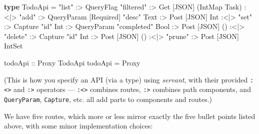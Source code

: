 \documentclass[]{article}
\newenvironment{Shaded}{}{}
\newcommand{\DataTypeTok}[1]{\textcolor[rgb]{0.56,0.13,0.00}{#1}}
\newcommand{\KeywordTok}[1]{\textcolor[rgb]{0.00,0.44,0.13}{\textbf{#1}}}
\newcommand{\NormalTok}[1]{#1}
\newcommand{\OperatorTok}[1]{\textcolor[rgb]{0.40,0.40,0.40}{#1}}
\newcommand{\OtherTok}[1]{\textcolor[rgb]{0.00,0.44,0.13}{#1}}
\newcommand{\StringTok}[1]{\textcolor[rgb]{0.25,0.44,0.63}{#1}}
\begin{document}
\begin{Shaded}
\begin{Highlighting}[]
\KeywordTok{type} \DataTypeTok{TodoApi} \OtherTok{=} \StringTok{"list"}   \OperatorTok{:\textgreater{}} \DataTypeTok{QueryFlag} \StringTok{"filtered"}
                        \OperatorTok{:\textgreater{}} \DataTypeTok{Get}\NormalTok{  \textquotesingle{}[}\DataTypeTok{JSON}\NormalTok{] (}\DataTypeTok{IntMap} \DataTypeTok{Task}\NormalTok{)}
          \OperatorTok{:\textless{}|\textgreater{}} \StringTok{"add"}    \OperatorTok{:\textgreater{}} \DataTypeTok{QueryParam\textquotesingle{}}\NormalTok{ \textquotesingle{}[}\DataTypeTok{Required}\NormalTok{] }\StringTok{"desc"} \DataTypeTok{Text}
                        \OperatorTok{:\textgreater{}} \DataTypeTok{Post}\NormalTok{ \textquotesingle{}[}\DataTypeTok{JSON}\NormalTok{] }\DataTypeTok{Int}
          \OperatorTok{:\textless{}|\textgreater{}} \StringTok{"set"}    \OperatorTok{:\textgreater{}} \DataTypeTok{Capture} \StringTok{"id"} \DataTypeTok{Int}
                        \OperatorTok{:\textgreater{}} \DataTypeTok{QueryParam} \StringTok{"completed"} \DataTypeTok{Bool}
                        \OperatorTok{:\textgreater{}} \DataTypeTok{Post}\NormalTok{ \textquotesingle{}[}\DataTypeTok{JSON}\NormalTok{] ()}
          \OperatorTok{:\textless{}|\textgreater{}} \StringTok{"delete"} \OperatorTok{:\textgreater{}} \DataTypeTok{Capture} \StringTok{"id"} \DataTypeTok{Int}
                        \OperatorTok{:\textgreater{}} \DataTypeTok{Post}\NormalTok{ \textquotesingle{}[}\DataTypeTok{JSON}\NormalTok{] ()}
          \OperatorTok{:\textless{}|\textgreater{}} \StringTok{"prune"}  \OperatorTok{:\textgreater{}} \DataTypeTok{Post}\NormalTok{ \textquotesingle{}[}\DataTypeTok{JSON}\NormalTok{] }\DataTypeTok{IntSet}

\OtherTok{todoApi ::} \DataTypeTok{Proxy} \DataTypeTok{TodoApi}
\NormalTok{todoApi }\OtherTok{=} \DataTypeTok{Proxy}
\end{Highlighting}
\end{Shaded}

(This is how you specify an API (via a type) using \emph{servant}, with their
provided \texttt{:\textless{}\textbar{}\textgreater{}} and
\texttt{:\textgreater{}} operators ---
\texttt{:\textless{}\textbar{}\textgreater{}} combines routes,
\texttt{:\textgreater{}} combines path components, and \texttt{QueryParam},
\texttt{Capture}, etc. all add parts to components and routes.)

We have five routes, which more or less mirror exactly the five bullet points
listed above, with some minor implementation choices:
\end{document}
